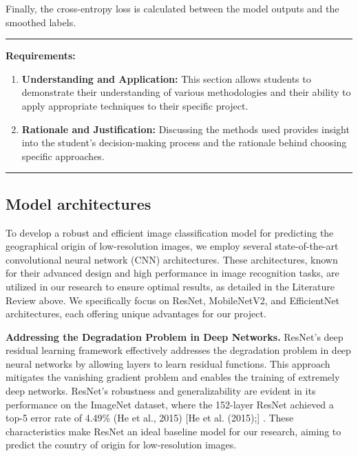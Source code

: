 Finally, the cross-entropy loss is calculated between the model outputs
and the smoothed labels.

\begin{center}\rule{0.5\linewidth}{0.5pt}\end{center}

\textbf{Requirements:}

\begin{enumerate}
\def\labelenumi{\arabic{enumi}.}
\tightlist
\item
  \textbf{Understanding and Application:} This section allows students
  to demonstrate their understanding of various methodologies and their
  ability to apply appropriate techniques to their specific project.
\item
  \textbf{Rationale and Justification:} Discussing the methods used
  provides insight into the student's decision-making process and the
  rationale behind choosing specific approaches.
\end{enumerate}

\begin{center}\rule{0.5\linewidth}{0.5pt}\end{center}

\subsection{Model architectures}\label{model-architectures}

To develop a robust and efficient image classification model for
predicting the geographical origin of low-resolution images, we employ
several state-of-the-art convolutional neural network (CNN)
architectures. These architectures, known for their advanced design and
high performance in image recognition tasks, are utilized in our
research to ensure optimal results, as detailed in the Literature Review
above. We specifically focus on ResNet, MobileNetV2, and EfficientNet
architectures, each offering unique advantages for our project.

\textbf{Addressing the Degradation Problem in Deep Networks.} ResNet's
deep residual learning framework effectively addresses the degradation
problem in deep neural networks by allowing layers to learn residual
functions. This approach mitigates the vanishing gradient problem and
enables the training of extremely deep networks. ResNet's robustness and
generalizability are evident in its performance on the ImageNet dataset,
where the 152-layer ResNet achieved a top-5 error rate of 4.49\% (He et
al., 2015) {[}He et al. (2015);{]} . These characteristics make ResNet
an ideal baseline model for our research, aiming to predict the country
of origin for low-resolution images.

